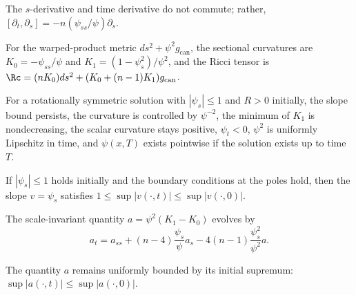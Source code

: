 \begin{remark}
\label{ch02-rem-neckpinch-pde}
The \(s\)-derivative and time derivative do not commute; rather,
\([\partial_t,\partial_s]=-n(\psi_{ss}/\psi)\partial_s\).
\end{remark}

\begin{remark}
\label{ch02-rem-neckpinch-curvatures}
For the warped-product metric \(ds^2+\psi^2g_{\mathrm{can}}\), the sectional
curvatures are \(K_0=-\psi_{ss}/\psi\) and \(K_1=(1-\psi_s^2)/\psi^2\), and
the Ricci tensor is \(\Rc=(nK_0)ds^2+(K_0+(n-1)K_1)g_{\mathrm{can}}\).
\end{remark}

\begin{proposition}
\label{ch02-prop-neckpinch-bounds}
For a rotationally symmetric solution with \(|\psi_s|\le 1\) and \(R>0\)
initially, the slope bound persists, the curvature is controlled by
\(\psi^{-2}\), the minimum of \(K_1\) is nondecreasing, the scalar curvature
stays positive, \(\psi_t<0\), \(\psi^2\) is uniformly Lipschitz in time, and
\(\psi(x,T)\) exists pointwise if the solution exists up to time \(T\).
\end{proposition}

\begin{lemma}
\label{ch02-lem-neckpinch-slope}
If \(|\psi_s|\le 1\) holds initially and the boundary conditions at the poles
hold, then the slope \(v=\psi_s\) satisfies \(1\le \sup|v(\cdot,t)|\le \sup|v(\cdot,0)|\).
\end{lemma}

\begin{lemma}
\label{ch02-lem-neckpinch-a-evolution}
The scale-invariant quantity \(a=\psi^2(K_1-K_0)\) evolves by
\[
a_t=a_{ss}+(n-4)\frac{\psi_s}{\psi}a_s-4(n-1)\frac{\psi_s^2}{\psi^2}a.
\]
\end{lemma}

\begin{corollary}
\label{ch02-cor-neckpinch-a-bound}
The quantity \(a\) remains uniformly bounded by its initial supremum:
\(\sup|a(\cdot,t)|\le \sup|a(\cdot,0)|\).
\end{corollary}

